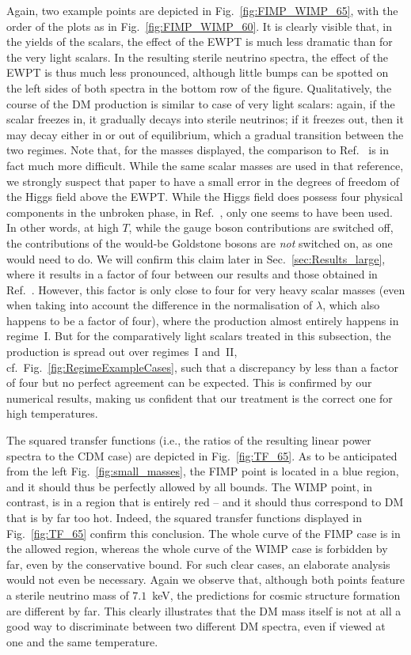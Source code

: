 Again, two example points are depicted in Fig.~\ref{fig:FIMP_WIMP_65}, with the order of the plots as in Fig.~\ref{fig:FIMP_WIMP_60}. It is clearly visible that, in the yields of the scalars, the effect of the EWPT is much less dramatic than for the very light scalars. In the resulting sterile neutrino spectra, the effect of the EWPT is thus much less pronounced, although little bumps can be spotted on the left sides of both spectra in the bottom row of the figure. Qualitatively, the course of the DM production is similar to case of very light scalars: again, if the scalar freezes in, it gradually decays into sterile neutrinos; if it freezes out, then it may decay either in or out of equilibrium, which a gradual transition between the two regimes. Note that, for the masses displayed, the comparison to Ref.~\cite{Adulpravitchai:2014xna} is in fact much more difficult. While the same scalar masses are used in that reference, we strongly suspect that paper to have a small error in the degrees of freedom of the Higgs field above the EWPT. While the Higgs field does possess four physical components in the unbroken phase, in Ref.~\cite{Adulpravitchai:2014xna}, only one seems to have been used. In other words, at high $T$, while the gauge boson contributions are switched off, the contributions of the would-be Goldstone bosons are \emph{not} switched on, as one would need to do. We will confirm this claim later in Sec.~\ref{sec:Results_large}, where it results in a factor of four between our results and those obtained in Ref.~\cite{Adulpravitchai:2014xna}. However, this factor is only close to four for very heavy scalar masses (even when taking into account the difference in the normalisation of $\lambda$, which also happens to be a factor of four), where the production almost entirely happens in regime~I. But for the comparatively light scalars treated in this subsection, the production is spread out over regimes~I and~II, cf.\ Fig.~\ref{fig:RegimeExampleCases}, such that a discrepancy by less than a factor of four but no perfect agreement can be expected. This is confirmed by our numerical results, making us confident that our treatment is the correct one for high temperatures.

The squared transfer functions (i.e., the ratios of the resulting linear power spectra to the CDM case) are depicted in Fig.~\ref{fig:TF_65}. As to be anticipated from the left Fig.~\ref{fig:small_masses}, the FIMP point is located in a blue region, and it should thus be perfectly allowed by all bounds. The WIMP point, in contrast, is in a region that is entirely red -- and it should thus correspond to DM that is by far too hot. Indeed, the squared transfer functions displayed in Fig.~\ref{fig:TF_65} confirm this conclusion. The whole curve of the FIMP case is in the allowed region, whereas the whole curve of the WIMP case is forbidden by far, even by the conservative bound. For such clear cases, an elaborate analysis would not even be necessary. Again we observe that, although both points feature a sterile neutrino mass of $7.1$~keV, the predictions for cosmic structure formation are different by far. This clearly illustrates that the DM mass itself is not at all a good way to discriminate between two different DM spectra, even if viewed at one and the same temperature.


